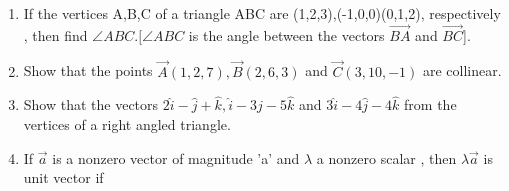 \begin{enumerate}[label=\thesection.\arabic*,ref=\thesection.\theenumi]
	\\
	\solution
		
\item If the vertices A,B,C of a triangle ABC are (1,2,3),(-1,0,0)(0,1,2), respectively , then find  $\angle{ABC}. [\angle{ABC}$ is the angle between the vectors $\overrightarrow{BA}$ and $\overrightarrow{BC}$].
	\\
	\solution
		
\item Show that the points $\vec{A}(1,2,7), \vec{B}(2,6,3)$ and $\vec{C}(3,10,-1)$ are collinear.
	\\
	\solution
		
\item Show that the vectors $2\hat{i}-\hat{j}+\hat{k},\hat{i}-3\hat{j}-5\hat{k}$ and  $3\hat{i}-4\hat{j}-4\hat{k}$ from the vertices of a right angled triangle.
	\\
	\solution
		
\item If $\overrightarrow {a}$ is a nonzero vector of magnitude 'a' and $\lambda$ a nonzero scalar , then $\lambda\overrightarrow {a}$ is unit vector if


\end{enumerate}
